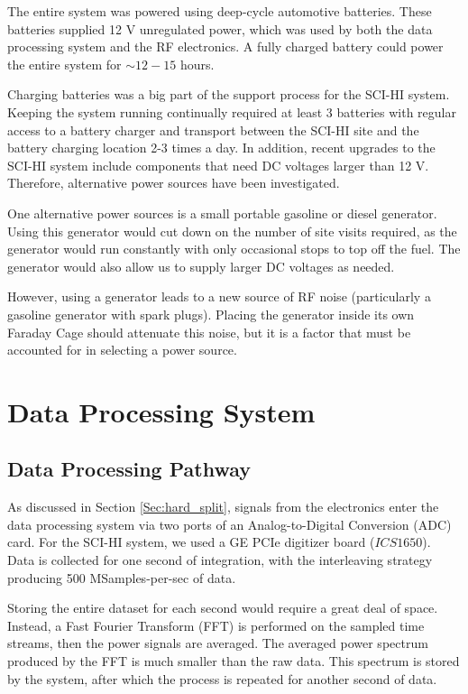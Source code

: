 The entire system was powered using deep-cycle automotive batteries. These batteries supplied 12 V unregulated power, which was used by both the data processing system and the RF electronics. A fully charged battery could power the entire system for $\sim12-15$ hours. 

Charging batteries was a big part of the support process for the SCI-HI system. Keeping the system running continually required at least 3 batteries with regular access to a battery charger and transport between the SCI-HI site and the battery charging location 2-3 times a day. In addition, recent upgrades to the SCI-HI system include components that need DC voltages larger than 12 V. Therefore, alternative power sources have been investigated.

One alternative power sources is a small portable gasoline or diesel generator. Using this generator would cut down on the number of site visits required, as the generator would run constantly with only occasional stops to top off the fuel. The generator would also allow us to supply larger DC voltages as needed. 

However, using a generator leads to a new source of RF noise (particularly a gasoline generator with spark plugs). Placing the generator inside its own Faraday Cage should attenuate this noise, but it is a factor that must be accounted for in selecting a power source. 


\section{Data Processing System}


\subsection{Data Processing Pathway}

As discussed in Section \ref{Sec:hard_split}, signals from the electronics enter the data processing system via two ports of an Analog-to-Digital Conversion (ADC) card. For the SCI-HI system, we used a GE PCIe digitizer board ($ICS1650$). Data is collected for one second of integration, with the interleaving strategy producing 500 MSamples-per-sec of data. 

Storing the entire dataset for each second would require a great deal of space. Instead, a Fast Fourier Transform (FFT) is performed on the sampled time streams, then the power signals are averaged. The averaged power spectrum produced by the FFT is much smaller than the raw data. This spectrum is stored by the system, after which the process is repeated for another second of data. 

